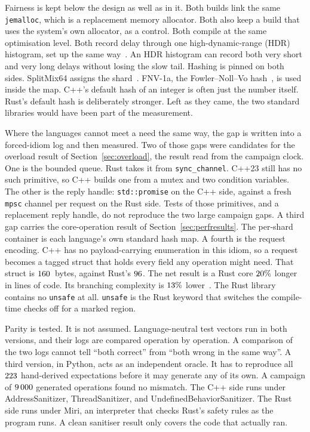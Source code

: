 \documentclass[english,oneside,a4paper,censored,csm,software-track-2020]{HYthesisML}
\begin{document}
Fairness is kept below the design as well as in it.
Both builds link the same \texttt{jemalloc}, which is a replacement memory allocator.
Both also keep a build that uses the system's own allocator, as a control.
Both compile at the same optimisation level.
Both record delay through one high-dynamic-range (HDR) histogram, set up the same way~\cite{tene_hdrhistogram}.
An HDR histogram can record both very short and very long delays without losing the slow tail.
Hashing is pinned on both sides.
SplitMix64 assigns the shard~\cite{steele2014splitmix}.
FNV-1a, the Fowler--Noll--Vo hash~\cite{rfc9923}, is used inside the map.
C++'s default hash of an integer is often just the number itself.
Rust's default hash is deliberately stronger.
Left as they came, the two standard libraries would have been part of the measurement.

Where the languages cannot meet a need the same way, the gap is written into a forced-idiom log and then measured.
Two of those gaps were candidates for the overload result of Section~\ref{sec:overload}, the result read from the campaign clock.
One is the bounded queue.
Rust takes it from \texttt{sync\_channel}.
C++23 still has no such primitive, so C++ builds one from a mutex and two condition variables.
The other is the reply handle: \texttt{std::promise} on the C++ side, against a fresh \texttt{mpsc} channel per request on the Rust side.
Tests of those primitives, and a replacement reply handle, do not reproduce the two large campaign gaps.
A third gap carries the core-operation result of Section~\ref{sec:perfresults}.
The per-shard container is each language's own standard hash map.
A fourth is the request encoding.
C++ has no payload-carrying enumeration in this idiom, so a request becomes a tagged struct that holds every field any operation might need.
That struct is $160$~bytes, against Rust's $96$.
The net result is a Rust core $20\%$ longer in lines of code.
Its branching complexity is $13\%$ lower~\cite{lizard}.
The Rust library contains no \texttt{unsafe} at all.
\texttt{unsafe} is the Rust keyword that switches the compile-time checks off for a marked region.

Parity is tested. It is not assumed.
Language-neutral test vectors run in both versions, and their logs are compared operation by operation.
A comparison of the two logs cannot tell ``both correct'' from ``both wrong in the same way''.
A third version, in Python, acts as an independent oracle.
It has to reproduce all $223$ hand-derived expectations before it may generate any of its own.
A campaign of $9\,000$ generated operations found no mismatch.
The C++ side runs under AddressSanitizer, ThreadSanitizer, and UndefinedBehaviorSanitizer.
The Rust side runs under Miri, an interpreter that checks Rust's safety rules as the program runs.
A clean sanitiser result only covers the code that actually ran.
\end{document}
